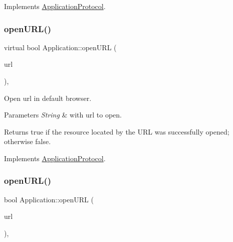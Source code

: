 Implements \hyperlink{classApplicationProtocol_a152a977b301a90253ec5a6533b2e8e04}{Application\+Protocol}.

\mbox{\label{classApplication_a13ccf5ab932de8a22255b56d085bed59}} 
\subsubsection{\texorpdfstring{open\+U\+R\+L()}{openURL()}\hspace{0.1cm}{\footnotesize\ttfamily [6/12]}}
{\footnotesize\ttfamily virtual bool Application\+::open\+U\+RL (\begin{DoxyParamCaption}\item[{const std\+::string \&}]{url }\end{DoxyParamCaption})\hspace{0.3cm}{\ttfamily [override]}, {\ttfamily [virtual]}}



Open url in default browser. 


\begin{DoxyParams}{Parameters}
{\em String} & with url to open. \\
\hline
\end{DoxyParams}
\begin{DoxyReturn}{Returns}
true if the resource located by the U\+RL was successfully opened; otherwise false. 
\end{DoxyReturn}


Implements \hyperlink{classApplicationProtocol_a152a977b301a90253ec5a6533b2e8e04}{Application\+Protocol}.

\mbox{\label{classApplication_a7efe73e7593e558749052d9decedf693}} 
\subsubsection{\texorpdfstring{open\+U\+R\+L()}{openURL()}\hspace{0.1cm}{\footnotesize\ttfamily [7/12]}}
{\footnotesize\ttfamily bool Application\+::open\+U\+RL (\begin{DoxyParamCaption}\item[{const std\+::string \&}]{url }\end{DoxyParamCaption})\hspace{0.3cm}{\ttfamily [override]}, {\ttfamily [virtual]}}



